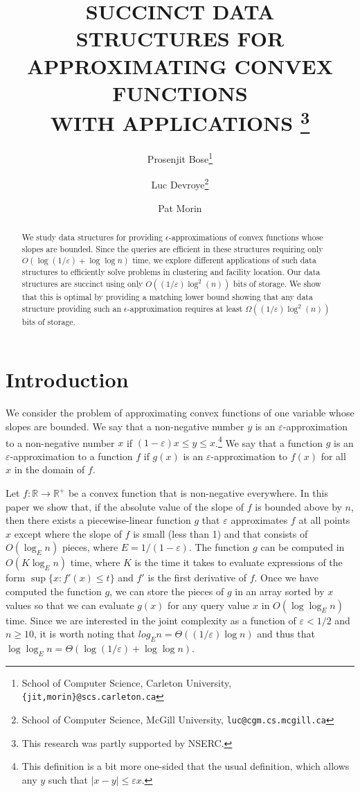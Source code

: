 \documentclass[charterfonts,lotsofwhite]{patmorin}
\title{\MakeUppercase{Succinct Data Structures for Approximating
Convex Functions} \\ \MakeUppercase{with Applications}%
     \thanks{This research was partly supported by NSERC.}}
\author{Prosenjit Bose\thanks{School of Computer Science, Carleton
	University, \texttt{\{jit,morin\}@scs.carleton.ca}} \and
  Luc Devroye\thanks{School of Computer Science, McGill University,
  	\texttt{luc@cgm.cs.mcgill.ca}} \and 
  Pat Morin\footnotemark[2]}
\date{}
\newcommand{\eps}{\varepsilon}
\newcommand{\Real}{\mathbb{R}}
\begin{document}
\maketitle

\begin{abstract}
We study data structures for providing $\epsilon$-approximations 
of convex functions whose
slopes are bounded. Since the queries are efficient in these 
structures requiring
only $O(\log(1/\eps)+\log\log n)$ time, 
we explore different applications 
of such data structures to efficiently solve
problems in clustering and facility location. Our data structures are succinct
using only $O((1/\eps)\log^2(n))$ bits of storage. 
We show that this is optimal by
providing a matching lower bound showing that any data structure 
providing such an
$\epsilon$-approximation requires at least $\Omega((1/\eps)\log^2(n))$ bits of storage.
\end{abstract}

\section{Introduction}

We consider the problem of approximating convex functions of 
one variable whose slopes are bounded.  
We say that a non-negative number $y$ is an
$\eps$-approximation to a non-negative number $x$ if $(1-\eps)x\le y
\le x$.\footnote{This definition is a bit more one-sided that the
usual definition, which allows any $y$ such that $|x-y|\le \eps
x$.}  We say that a function $g$ is an $\eps$-approximation to a
function $f$ if $g(x)$ is an $\eps$-approximation to $f(x)$ for all
$x$ in the domain of $f$.

Let $f:\Real\rightarrow \Real^+$ be a convex function that is
non-negative everywhere.  In this paper we show that, if the absolute
value of the slope of $f$ is bounded above by $n$, then there exists a
piecewise-linear function $g$ that $\eps$ approximates $f$ at all
points $x$ except where the slope of $f$ is small (less than 1) and
that consists of $O(\log_E n)$ pieces, where $E=1/(1-\eps)$.  The
function $g$ can be computed in $O(K\log_E n)$ time, where $K$ is the
time it takes to evaluate expressions of the form $\sup\{x: f'(x)\le
t\}$ and $f'$ is the first derivative of $f$.  Once we have computed
the function $g$, we can store the pieces of $g$ in an array sorted by
$x$ values so that we can evaluate $g(x)$ for any query value $x$ in
$O(\log\log_E n)$ time.  Since we are interested in the joint
complexity as a function of $\eps < 1/2$ and $n \ge 10$, it is worth
noting that $log_E n = \Theta ( (1/\eps) \log n)$ and thus that
$\log\log_E n = \Theta (\log (1/\eps) + \log \log n)$.
\end{document}
